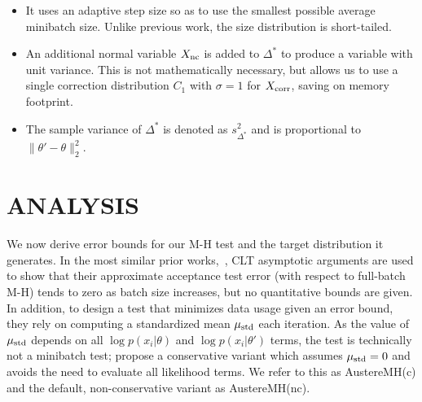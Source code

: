 \documentclass[letterpaper]{article}
\begin{document}
\begin{itemize}[noitemsep]
    \item It uses an adaptive step size so as to use the smallest possible
    average minibatch size. Unlike previous work, the size distribution is
    short-tailed.

    \item An additional normal variable $X_{\rm nc}$ is added to $\Delta^*$ to
    produce a variable with unit variance. This is not mathematically necessary,
    but allows us to use a single correction distribution $C_1$ with $\sigma=1$
    for $X_{\rm corr}$, saving on memory footprint.

    \item The sample variance of $\Delta^*$ is denoted as $s^2_{\Delta^*}$ and
    is proportional to $\|\theta'-\theta\|_2^2$.
    
\end{itemize}





\section{ANALYSIS}\label{sec:analysis}

We now derive error bounds for our M-H test and the target distribution it
generates. In the most similar prior works,~\citep{cutting_mh_2014}, CLT
asymptotic arguments are used to show that their approximate acceptance test
error (with respect to full-batch M-H) tends to zero as batch size increases,
but no quantitative bounds are given. In addition, to design a test that
minimizes data usage given an error bound, they rely on computing a standardized
mean $\mu_{\rm std}$ each iteration. As the value of $\mu_{\rm std}$ depends on
all $\log p(x_i|\theta)$ and $\log p(x_i| \theta')$ terms, the test is
technically not a minibatch test; \citep{cutting_mh_2014} propose a conservative
variant which assumes $\mu_{\rm std}=0$ and avoids the need to evaluate all
likelihood terms. We refer to this as {\sc AustereMH(c)} and the default,
non-conservative variant as {\sc AustereMH(nc)}.
\end{document}
